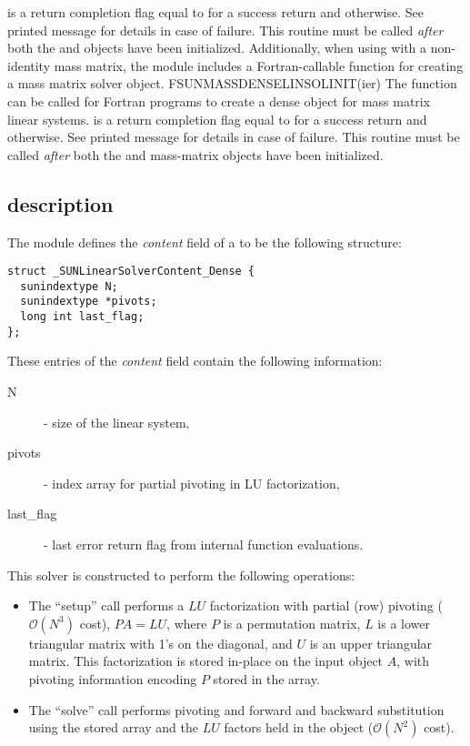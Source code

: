 {
   is a return completion flag equal to  for a success
  return and  otherwise. See printed message for details in case
  of failure.
}
{
  This routine must be
  called \emph{after} both the {\nvector} and {\sunmatrix} objects have
  been initialized.
}
Additionally, when using {\arkode} with a non-identity
mass matrix, the {\sunlinsoldense} module includes a Fortran-callable
function for creating a  mass matrix solver
object.
{
  FSUNMASSDENSELINSOLINIT(ier)
}
{
  The function  can be called for Fortran programs
  to create a dense  object for mass matrix linear
  systems.
}
{
}
{
   is a  return completion flag equal to  for a success
  return and  otherwise. See printed message for details in case
  of failure.
}
{
  This routine must be
  called \emph{after} both the {\nvector} and {\sunmatrix} mass-matrix
  objects have been initialized.
}

\subsection{{\sunlinsoldense} description}\label{ss:sunlinsol_dense_description}



The {\sunlinsoldense} module defines the {\em
content} field of a  to be the following structure:
\begin{verbatim} 
struct _SUNLinearSolverContent_Dense {
  sunindextype N;
  sunindextype *pivots;
  long int last_flag;
};
\end{verbatim}
These entries of the \emph{content} field contain the following
information:
\begin{description}
  \item[N] - size of the linear system,
  \item[pivots] - index array for partial pivoting in LU factorization,
  \item[last\_flag] - last error return flag from internal function evaluations.
\end{description}

This solver is constructed to perform the following operations:
\begin{itemize}
\item The ``setup'' call performs a $LU$ factorization with
  partial (row) pivoting ($\mathcal O(N^3)$ cost), $PA=LU$, where $P$
  is a permutation matrix, $L$ is a lower triangular matrix with 1's
  on the diagonal, and $U$ is an upper triangular matrix.  This
  factorization is stored in-place on the input {\sunmatdense} object
  $A$, with pivoting information encoding $P$ stored in
  the  array.
\item The ``solve'' call performs pivoting and forward and
  backward substitution using the stored  array and the
  $LU$ factors held in the {\sunmatdense} object ($\mathcal O(N^2)$
  cost).
\end{itemize}

